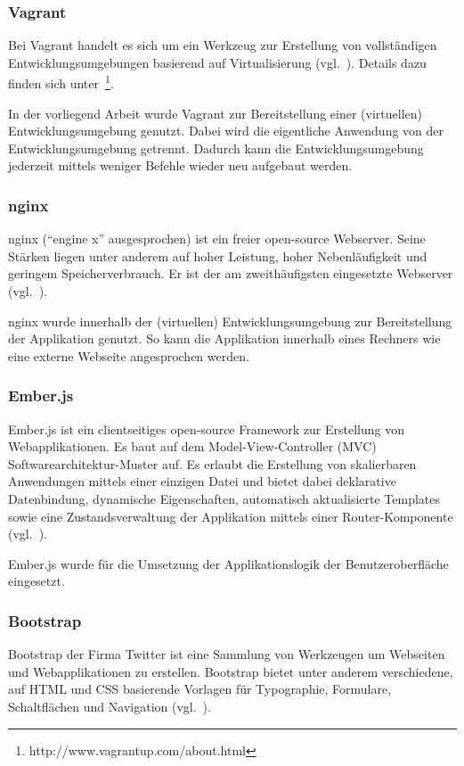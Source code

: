 \subsubsection{Vagrant}
\label{ssubsec:komponenten:gui:komponenten:vagrant}
Bei Vagrant handelt es sich um ein Werkzeug zur Erstellung von vollständigen Entwicklungsumgebungen basierend auf Virtualisierung (vgl.~\cite{vagrant}). Details dazu finden sich unter~\footnote{http://www.vagrantup.com/about.html}.

In der vorliegend Arbeit wurde Vagrant zur Bereitstellung einer (virtuellen) Entwicklungsumgebung genutzt. Dabei wird die eigentliche Anwendung von der Entwicklungsumgebung getrennt. Dadurch kann die Entwicklungsumgebung jederzeit mittels weniger Befehle wieder neu aufgebaut werden.

\subsubsection{nginx}
\label{ssubsec:komponenten:gui:komponenten:nginx}
nginx (``engine x'' ausgesprochen) ist ein freier open-source Webserver. Seine Stärken liegen unter anderem  auf hoher Leistung, hoher Nebenläufigkeit und geringem Speicherverbrauch. Er ist der am zweithäufigsten eingesetzte Webserver (vgl.~\cite{nginx}).

nginx wurde innerhalb der (virtuellen) Entwicklungsumgebung zur Bereitstellung der Applikation genutzt. So kann die Applikation innerhalb eines Rechners wie eine externe Webseite angesprochen werden.

\subsubsection{Ember.js}
\label{ssubsec:komponenten:gui:komponenten:emberjs}
Ember.js ist ein clientseitiges open-source Framework zur Erstellung von Webapplikationen. Es baut auf dem Model-View-Controller (MVC) Softwarearchitektur-Muster auf. Es erlaubt die Erstellung von skalierbaren Anwendungen mittels einer einzigen Datei und bietet dabei deklarative Datenbindung, dynamische Eigenschaften, automatisch aktualisierte Templates sowie eine Zustandsverwaltung der Applikation mittels einer Router-Komponente (vgl.~\cite{ember}).

Ember.js wurde für die Umsetzung der Applikationslogik der Benutzeroberfläche eingesetzt.

\subsubsection{Bootstrap}
\label{ssubsec:komponenten:gui:komponenten:bootstrap}
Bootstrap der Firma Twitter ist eine Sammlung von Werkzeugen um Webseiten und Webapplikationen zu erstellen. Bootstrap bietet unter anderem verschiedene, auf HTML und CSS basierende Vorlagen für Typographie, Formulare, Schaltflächen und Navigation (vgl.~\cite{bootstrap}).

